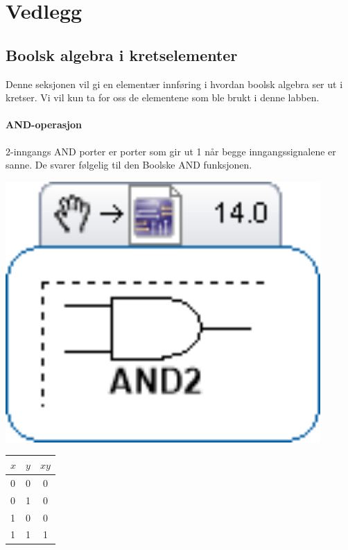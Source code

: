 \documentclass[11pt, a4paper, norwegian]{article}
\begin{document}
\newpage
{}
\section{Vedlegg} \label{sec_append}

\subsection{Boolsk algebra i kretselementer}
Denne seksjonen vil gi en elementær innføring i hvordan boolsk algebra ser ut i kretser. Vi vil kun ta for oss de elementene som ble brukt i denne labben. 
\paragraph{AND-operasjon} 
2-inngangs AND porter er porter som gir ut 1 når begge inngangssignalene er sanne. De svarer følgelig til den Boolske AND funksjonen. 


{\centering
\begin{minipage}{0.45\textwidth}
  \centering
  \includegraphics[width=0.9\textwidth]{port_and.png}
  \label{fig_and}
\end{minipage}
\begin{minipage}{0.45\textwidth}
  \centering
  \label{tbl_and}
  \begin{tabular}{|ll||c|}
        \hline
        $x$ & $y$ & $xy$ \\ 	\hline
        0 & 0 & 0 \\
        0 & 1 & 0 \\
        1 & 0 & 0 \\
        1 & 1 & 1 \\ \hline
  \end{tabular}
\end{minipage}
\endgraf\bigskip
}
\end{document}
